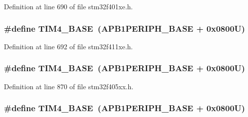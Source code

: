 Definition at line 690 of file stm32f401xe.\+h.

\subsubsection[{\texorpdfstring{T\+I\+M4\+\_\+\+B\+A\+SE}{TIM4_BASE}}]{\setlength{\rightskip}{0pt plus 5cm}\#define T\+I\+M4\+\_\+\+B\+A\+SE~({\bf A\+P\+B1\+P\+E\+R\+I\+P\+H\+\_\+\+B\+A\+SE} + 0x0800\+U)}\hypertarget{group___peripheral__registers__structures_ga56e2d44b0002f316527b8913866a370d}{}\label{group___peripheral__registers__structures_ga56e2d44b0002f316527b8913866a370d}


Definition at line 692 of file stm32f411xe.\+h.

\subsubsection[{\texorpdfstring{T\+I\+M4\+\_\+\+B\+A\+SE}{TIM4_BASE}}]{\setlength{\rightskip}{0pt plus 5cm}\#define T\+I\+M4\+\_\+\+B\+A\+SE~({\bf A\+P\+B1\+P\+E\+R\+I\+P\+H\+\_\+\+B\+A\+SE} + 0x0800\+U)}\hypertarget{group___peripheral__registers__structures_ga56e2d44b0002f316527b8913866a370d}{}\label{group___peripheral__registers__structures_ga56e2d44b0002f316527b8913866a370d}


Definition at line 870 of file stm32f405xx.\+h.

\subsubsection[{\texorpdfstring{T\+I\+M4\+\_\+\+B\+A\+SE}{TIM4_BASE}}]{\setlength{\rightskip}{0pt plus 5cm}\#define T\+I\+M4\+\_\+\+B\+A\+SE~({\bf A\+P\+B1\+P\+E\+R\+I\+P\+H\+\_\+\+B\+A\+SE} + 0x0800\+U)}\hypertarget{group___peripheral__registers__structures_ga56e2d44b0002f316527b8913866a370d}{}\label{group___peripheral__registers__structures_ga56e2d44b0002f316527b8913866a370d}


